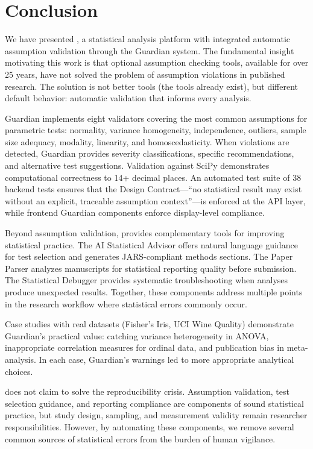 \documentclass[article]{jss}
\begin{document}
\section{Conclusion} \label{sec:conclusion}

We have presented , a statistical analysis platform with integrated automatic assumption validation through the Guardian system. The fundamental insight motivating this work is that optional assumption checking tools, available for over 25 years, have not solved the problem of assumption violations in published research. The solution is not better tools (the tools already exist), but different default behavior: automatic validation that informs every analysis.

Guardian implements eight validators covering the most common assumptions for parametric tests: normality, variance homogeneity, independence, outliers, sample size adequacy, modality, linearity, and homoscedasticity. When violations are detected, Guardian provides severity classifications, specific recommendations, and alternative test suggestions. Validation against SciPy demonstrates computational correctness to 14+ decimal places. An automated test suite of 38 backend tests ensures that the Design Contract---``no statistical result may exist without an explicit, traceable assumption context''---is enforced at the API layer, while frontend Guardian components enforce display-level compliance.

Beyond assumption validation,  provides complementary tools for improving statistical practice. The AI Statistical Advisor offers natural language guidance for test selection and generates JARS-compliant methods sections. The Paper Parser analyzes manuscripts for statistical reporting quality before submission. The Statistical Debugger provides systematic troubleshooting when analyses produce unexpected results. Together, these components address multiple points in the research workflow where statistical errors commonly occur.

Case studies with real datasets (Fisher's Iris, UCI Wine Quality) demonstrate Guardian's practical value: catching variance heterogeneity in ANOVA, inappropriate correlation measures for ordinal data, and publication bias in meta-analysis. In each case, Guardian's warnings led to more appropriate analytical choices.

 does not claim to solve the reproducibility crisis. Assumption validation, test selection guidance, and reporting compliance are components of sound statistical practice, but study design, sampling, and measurement validity remain researcher responsibilities. However, by automating these components, we remove several common sources of statistical errors from the burden of human vigilance.
\end{document}
